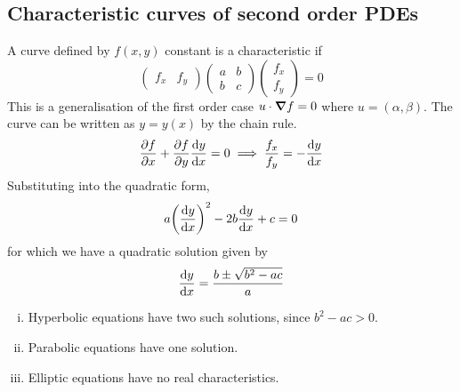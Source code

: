 \subsection{Characteristic curves of second order PDEs}
A curve defined by \( f(x,y) \) constant is a characteristic if
\[
	\begin{pmatrix}
		f_x & f_y
	\end{pmatrix} \begin{pmatrix}
		a & b \\
		b & c
	\end{pmatrix} \begin{pmatrix}
		f_x \\ f_y
	\end{pmatrix} = 0
\]
This is a generalisation of the first order case \( u \cdot \grad{f} = 0 \) where \( u = (\alpha, \beta) \).
The curve can be written as \( y = y(x) \) by the chain rule.
\[
	\pdv{f}{x} + \pdv{f}{y} \dv{y}{x} = 0 \implies \frac{f_x}{f_y} = -\dv{y}{x}
\]
Substituting into the quadratic form,
\[
	a \qty(\dv{y}{x})^2 - 2b \dv{y}{x} + c = 0
\]
for which we have a quadratic solution given by
\[
	\dv{y}{x} = \frac{b \pm \sqrt{b^2 - ac}}{a}
\]
\begin{enumerate}[(i)]
	\item Hyperbolic equations have two such solutions, since \( b^2 - ac > 0 \).
	\item Parabolic equations have one solution.
	\item Elliptic equations have no real characteristics.
\end{enumerate}
